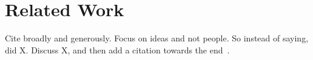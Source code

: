 \section{Related Work}
\label{sec:related}

Cite broadly and generously. 
Focus on ideas and not people. So instead of saying, \citet{pruthi2019combating} did X. 
Discuss X, and then add a citation towards the end~\citep{pruthi2019combating}.

